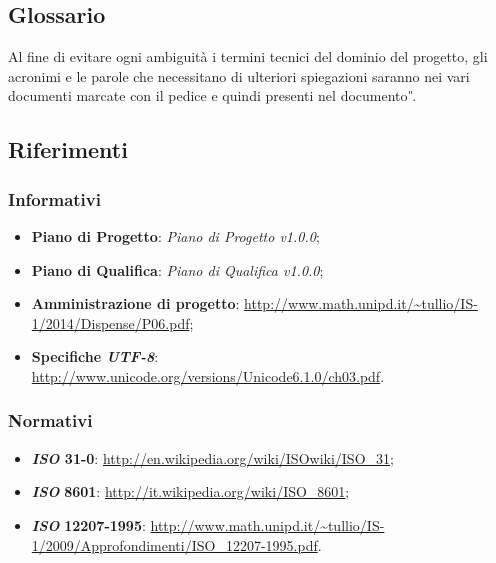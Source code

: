 \subsection{Glossario}
Al fine di evitare ogni ambiguità i termini tecnici del dominio del progetto, gli acronimi e le parole che necessitano di ulteriori spiegazioni saranno nei vari documenti marcate con il pedice  e quindi presenti nel documento \textit{\G}.

\subsection{Riferimenti}
\subsubsection{Informativi}
\begin{itemize}
\item
\textbf{Piano di Progetto}: \textit{Piano di Progetto v1.0.0};
\item
\textbf{Piano di Qualifica}: \textit{Piano di Qualifica v1.0.0};
\item
\textbf{Amministrazione di progetto}: \url{http://www.math.unipd.it/~tullio/IS-1/2014/Dispense/P06.pdf};
\item
\textbf{Specifiche \textit{UTF-8}}: \url{http://www.unicode.org/versions/Unicode6.1.0/ch03.pdf}.
\end{itemize}

\subsubsection{Normativi}
\begin{itemize}
\item
\textbf{\textit{ISO} 31-0}: \url{http://en.wikipedia.org/wiki/ISOwiki/ISO\_31};
\item
\textbf{\textit{ISO}} \textbf{8601}: \url{http://it.wikipedia.org/wiki/ISO\_8601};
\item
\textbf{\textit{ISO}} \textbf{12207-1995}: \url{http://www.math.unipd.it/~tullio/IS-1/2009/Approfondimenti/ISO\_12207-1995.pdf}.

\end{itemize}